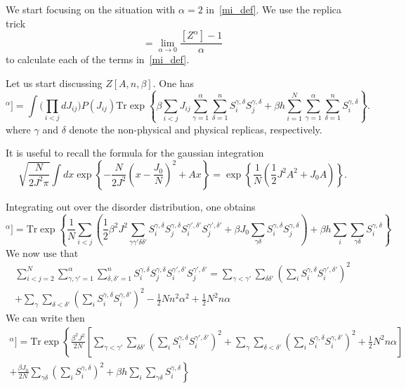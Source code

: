 \documentclass[onecolumn,superscriptaddress,pr]{revtex4}
\def\tr{\textrm{Tr}}
\begin{document}
We start focusing on the situation with $\alpha=2$ in~\eqref{mi_def}. We use 
the replica trick
%
\begin{equation}
[\log Z]=\lim_{\alpha\to 0}\frac{[Z^\alpha]-1}{\alpha}
\end{equation}
%
to calculate each of the terms in~\eqref{mi_def}. 

Let us start discussing $Z[A,n,\beta]$. One has 
%
\begin{equation}
[Z[A,n,\beta]^\alpha]=\int\Big(\prod_{i<j}dJ_{ij}\Big) P(J_{ij})
\tr\exp\left\{\beta\sum\limits_{i<j}J_{ij}\sum\limits_{\gamma=1}^\alpha
\sum\limits_{\delta=1}^nS_i^{\gamma,\delta}S_j^{\gamma,\delta}
+\beta h\sum\limits_{i=1}^N\sum\limits_{\gamma=1}^\alpha\sum
\limits_{\delta=1}^nS^{\gamma,\delta}_i\right\}.
\end{equation}
%
where $\gamma$ and $\delta$ denote the non-physical and physical replicas, 
respectively. 

It is useful to recall the formula for the gaussian integration
%
\begin{equation}
\sqrt{\frac{N}{2J^2\pi}}\int dx\exp\left\{-\frac{N}{2J^2}
\left(x-\frac{J_0}{N}\right)^2+Ax\right\}=
\exp\left\{\frac{1}{N}\left(\frac{1}{2}
J^2A^2+J_0A\right)\right\}.
\end{equation}
%

Integrating out over the disorder distribution, one obtains
%
\begin{equation}
[Z[A,n,\beta]^\alpha]=\tr\exp\left\{\frac{1}{N}\sum\limits_{i<j}\left(
\frac{1}{2}\beta^2J^2\sum\limits_{\gamma\gamma'\delta\delta'}S^{\gamma,
\delta}_iS^{\gamma,\delta}_j
S^{\gamma',\delta'}_iS^{\gamma',\delta'}_j+\beta J_0\sum\limits_{\gamma
\delta}S_i^{\gamma,\delta}S_j^{\gamma,\delta}\right)+\beta h\sum\limits_{i}
\sum\limits_{\gamma\delta}S_i^{\gamma,\delta}\right\}
\end{equation}
%
We now use that 
%
\begin{multline}
\sum\limits_{i<j=2}^N\sum\limits_{\gamma,\gamma'=1}^\alpha\sum\limits_{\delta,
\delta'=1}^n S^{\gamma,\delta}_iS_j^{\gamma,\delta}S_i^{\gamma',\delta'}
S_j^{\gamma',\delta'}=\sum\limits_{\gamma<\gamma'}\sum
\limits_{\delta\delta'}\left(\sum_i S_i^{\gamma,\delta}
S_i^{\gamma',\delta'}\right)^2\\
+\sum\limits_{\gamma}\sum\limits_{\delta<\delta'}
\left(\sum_iS_i^{\gamma,\delta} S_i^{\gamma,\delta'}\right)^2
-\frac{1}{2}Nn^2\alpha^2+\frac{1}{2}N^2n\alpha
\end{multline}
%
We can write then
%
\begin{multline}
[Z[A,n,\beta]^\alpha]=
\tr\exp\left\{\frac{\beta^2J^2}{2N}\left[\sum\limits_{\gamma<\gamma'}
\sum\limits_{\delta\delta'}\left(\sum_i S_i^{\gamma,\delta}S_i^{
\gamma',\delta'}\right)^2+\sum_\gamma\sum\limits_{\delta<\delta'}
\left(\sum_i S_i^{\gamma,\delta}S_i^{\gamma,\delta'}\right)^2
+\frac{1}{2}N^2n\alpha\right]\right.\\
\left.+\frac{\beta J_0}{2N}\sum\limits_{\gamma\delta}\left(\sum_i
S_i^{\gamma,\delta}\right)^2+\beta h\sum_i\sum\limits_{\gamma\delta}
S_i^{\gamma,\delta}
\right\}
\end{multline}
\end{document}
